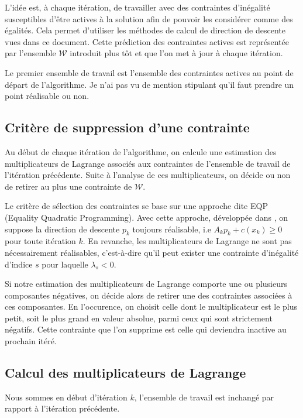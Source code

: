 \documentclass[a4paper,11pt]{article}
\numberwithin{equation}{section}
\begin{document}
L'idée est, à chaque itération, de travailler avec des contraintes d'inégalité susceptibles d'être actives à la solution afin de pouvoir les considérer comme des égalités. Cela permet d'utiliser les méthodes de calcul de direction de descente vues dans ce document. Cette prédiction des contraintes actives est représentée par l'ensemble $\mathcal{W}$ introduit plus tôt et que l'on met à jour à chaque itération. 

Le premier ensemble de travail est l'ensemble des contraintes actives au point de départ de l'algorithme. Je n'ai pas vu de mention stipulant qu'il faut prendre un point réalisable ou non.
\subsection{Critère de suppression d'une contrainte} \label{criteresupr}

Au début de chaque itération de l'algorithme, on calcule une estimation des multiplicateurs de Lagrange associés aux contraintes de l'ensemble de travail de l'itération précédente. Suite à l'analyse de ces multiplicateurs, on décide ou non de retirer au plus une contrainte de $\mathcal{W}$.

Le critère de sélection des contraintes se base sur une approche dite EQP (Equality Quadratic Programming). Avec cette approche, développée dans \cite{gillmurray1985}, on suppose la direction de descente $p_{k}$ toujours réalisable, i.e $A_{k}p_{k} + c(x_{k}) \geq 0$ pour toute itération $k$. En revanche, les multiplicateurs de Lagrange ne sont pas nécessairement réalisables, c'est-à-dire qu'il peut exister une contrainte d'inégalité d'indice $s$ pour laquelle $\lambda_{s}<0$.  

Si notre estimation des multiplicateurs de Lagrange comporte une ou plusieurs composantes négatives, on décide alors de retirer une des contraintes associées à ces composantes. En l'occurence, on choisit celle dont le multiplicateur est le plus petit, soit le plus grand en valeur absolue, parmi ceux qui sont strictement négatifs. Cette contrainte que l'on supprime est celle qui deviendra inactive au prochain itéré.

\subsection{Calcul des multiplicateurs de Lagrange}

Nous sommes en début d'itération $k$, l'ensemble de travail est inchangé par rapport à l'itération précédente.
\end{document}

